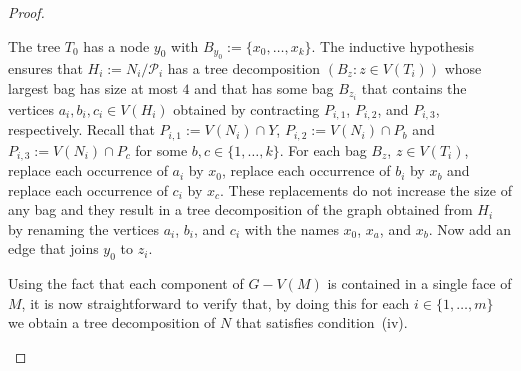 \documentclass{patmorin}
\begin{document}
\begin{proof}
\begin{compactenum}[(i)]
    The tree $T_0$ has a node $y_0$ with $B_{y_0}:=\{x_0,\ldots,x_k\}$.
    The inductive hypothesis ensures that $H_i:=N_i/\mathcal{P}_i$ has a tree decomposition $(B_z:z\in V(T_i))$ whose largest bag has size at most $4$ and that has some bag $B_{z_i}$ that contains the vertices $a_i,b_i,c_i\in V(H_i)$ obtained by contracting $P_{i,1}$, $P_{i,2}$, and $P_{i,3}$, respectively.   Recall that $P_{i,1}:=V(N_i)\cap Y$, $P_{i,2}:=V(N_i)\cap P_b$ and $P_{i,3}:=V(N_i)\cap P_c$ for some $b,c\in\{1,\ldots,k\}$.  For each bag $B_z$, $z\in V(T_i)$, replace each occurrence of $a_i$ by $x_0$, replace each occurrence of $b_i$ by $x_b$ and replace each occurrence of $c_i$ by $x_c$.  These replacements do not increase the size of any bag and they result in a tree decomposition of the graph obtained from $H_i$ by renaming the vertices $a_i$, $b_i$, and $c_i$ with the names $x_0$, $x_a$, and $x_b$. Now add an edge that joins $y_0$ to $z_i$.

    Using the fact that each component of $G-V(M)$ is contained in a single face of $M$, it is now straightforward to verify that, by doing this for each $i\in\{1,\ldots,m\}$ we obtain a tree decomposition of $N$ that satisfies condition~(iv).  \qedhere
  \end{compactenum}


\end{proof}
\end{document}
